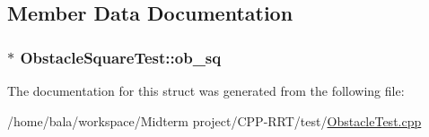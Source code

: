 \subsection{Member Data Documentation}
\subsubsection[{\texorpdfstring{ob\+\_\+sq}{ob_sq}}]{$\ast$ Obstacle\+Square\+Test\+::ob\+\_\+sq}\hypertarget{structObstacleSquareTest_a824c56e1d851328b7130e42d64b1c571}{}\label{structObstacleSquareTest_a824c56e1d851328b7130e42d64b1c571}


The documentation for this struct was generated from the following file\+:\begin{DoxyCompactItemize}
\item 
/home/bala/workspace/\+Midterm project/\+C\+P\+P-\/\+R\+R\+T/test/\hyperlink{ObstacleTest_8cpp}{Obstacle\+Test.\+cpp}\end{DoxyCompactItemize}
